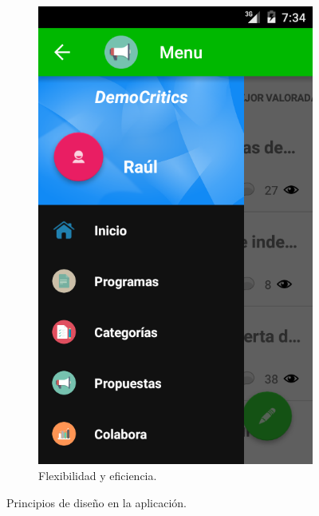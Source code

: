 \begin{figure}[H]
\begin{subfigure}[b]{0.3\textwidth}
                \includegraphics[width=\textwidth]{Media/Captures/principio07.png}
                \caption{Flexibilidad y eficiencia.}
                \label{fig:designPrinciplesFlexibility}
        \end{subfigure}
        \caption{Principios de diseño en la aplicación.}\label{fig:designPrinciplesCaptures}
	\end{figure}

